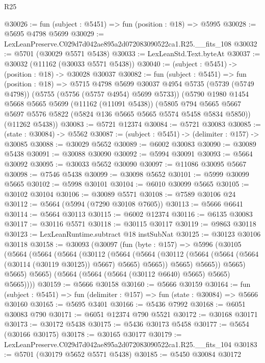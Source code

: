 \begin{lexlean}{R25}
\begin{coremodule}
@30026 := fun (subject : @5451) => fun (position : @18) => @5995
@30028 := @5695 @4798 @5699
@30029 := LexLeanPreserve.C029d7d042ae895a2d072083090522ca1.R25.__fits_108
@30032 := @5701 (@30029 @5571 @5438)
@30033 := LexLeanStd.Text.byteAt
@30037 := @30032 (@11162 (@30033 @5571 @5438))
@30040 := (subject : @5451) -> (position : @18) -> @30028 @30037
@30082 := fun (subject : @5451) =>
  fun (position : @18) =>
  @5715
    @4798
    @5699
    @30037
    @4954
    @5735
    (@5739 (@5749 @4798))
    (@5755 (@5756 (@5757 @4954) @5699 @5733))
    (@5790
      @1980
      @1454
      @5668
      @5665
      @5699
      (@11162 (@11091 @5438))
      (@5805 @794 @5665 @5667 @5697 @5576 @5822 (@5824 @136 @5665 @5665 @5574 @5458 @5834 @5850))
      (@11262 @5438))
@30083 := @5721 @12374
@30084 := @5721 @30083
@30085 := (state : @30084) -> @5562
@30087 := (subject : @5451) -> (delimiter : @157) -> @30085
@30088 := @30029 @5652
@30089 := @6002 @30083
@30090 := @30089 @5438
@30091 := @30088 @30090
@30092 := @5994 @30091
@30093 := @5664 @30092
@30095 := @30033 @5652 @30090
@30097 := @11086 @30095 @5667
@30098 := @7546 @5438
@30099 := @30098 @5652
@30101 := @5999 @30099 @5665
@30102 := @5998 @30101
@30104 := @6010 @30099 @5665
@30105 := @30102 @30104
@30106 := @30089 @5571
@30108 := @7589 @30106 @24
@30112 := @5664 (@5994 (@7290 @30108 @7605))
@30113 := @5666 @6641
@30114 := @5664 @30113
@30115 := @6002 @12374
@30116 := @6135 @30083
@30117 := @30116 @5571
@30118 := @30115 @30117
@30119 := @9863 @30118
@30123 := LexLeanRuntime.subtract @18 instSubNat
@30125 := @30123 @30106 @30118
@30158 := @30093
    (@30097
      (fun (byte : @157) =>
      @5996
        (@30105
          (@5664
            (@5664
              (@5664
                (@30112
                  (@5664
                    (@5664
                      (@30112 (@5664 (@5664 (@5664 (@30114 (@30119 @30125)) @5667) @5665) @5665))
                      @5665)
                    @5665))
                @5665)
              @5665)
            @5665)
          (@5664 (@5664 (@5664 (@30112 @6640) @5665) @5665) @5665))))
@30159 := @5666 @30158
@30160 := @5666 @30159
@30164 := fun (subject : @5451) => fun (delimiter : @157) => fun (state : @30084) => @5666 @30160
@30165 := @5695 @3401
@30166 := @5436 @7992
@30168 := @6051 @30083 @790
@30171 := @6051 @12374 @790 @5521
@30172 := @30168 @30171
@30173 := @30172 @5438
@30175 := @5436 @30173 @5458
@30177 := @5654 (@30166 @30175)
@30178 := @30165 @30177
@30179 := LexLeanPreserve.C029d7d042ae895a2d072083090522ca1.R25.__fits_104
@30183 := @5701 (@30179 @5652 @5571 @5438)
@30185 := @5450 @30084 @30172

\end{coremodule}
\end{lexlean}
